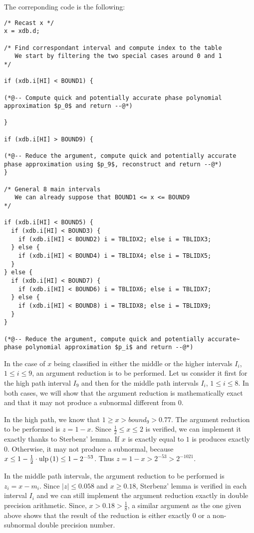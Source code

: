 The correponding code is the following:
\begin{lstlisting}[caption={Interval discrimination},firstnumber=1]
/* Recast x */
x = xdb.d;

/* Find correspondant interval and compute index to the table
   We start by filtering the two special cases around 0 and 1
*/

if (xdb.i[HI] < BOUND1) {

(*@-- Compute quick and potentially accurate phase polynomial approximation $p_0$ and return --@*)

}

if (xdb.i[HI] > BOUND9) {

(*@-- Reduce the argument, compute quick and potentially accurate
phase approximation using $p_9$, reconstruct and return --@*)
}

/* General 8 main intervals 
   We can already suppose that BOUND1 <= x <= BOUND9
*/

if (xdb.i[HI] < BOUND5) {
  if (xdb.i[HI] < BOUND3) {
    if (xdb.i[HI] < BOUND2) i = TBLIDX2; else i = TBLIDX3;
  } else {
    if (xdb.i[HI] < BOUND4) i = TBLIDX4; else i = TBLIDX5;
  }
} else {
  if (xdb.i[HI] < BOUND7) {
    if (xdb.i[HI] < BOUND6) i = TBLIDX6; else i = TBLIDX7;
  } else {
    if (xdb.i[HI] < BOUND8) i = TBLIDX8; else i = TBLIDX9;
  }
}

(*@-- Reduce the argument, compute quick and potentially accurate~
phase polynomial approximation $p_i$ and return --@*)
\end{lstlisting}

In the case of $x$ being classified in either the middle or the higher
intervals $I_i$, $1 \leq i \leq 9$, an argument reduction is to be
performed. Let us consider it first for the high path interval $I_9$
and then for the middle path intervals $I_i$, $1 \leq i \leq 8$. In
both cases, we will show that the argument reduction is mathematically
exact and that it may not produce a subnormal different from $0$.

In the high path, we know that $1 \geq x > bound_9 > 0.77$. The
argument reduction to be performed is $z = 1 - x$. Since $\frac{1}{2}
\leq x \leq 2$ is verified, we can implement it exactly thanks to
Sterbenz' lemma. If $x$ is exactly equal to $1$ is produces exactly
$0$. Otherwise, it may not produce a subnormal, because $x \leq 1 -
\frac{1}{2} \cdot \mathrm{ulp}\left( 1 \right) \leq 1 - 2^{-53}$. Thus $z = 1
- x > 2^{-53} > 2^{-1021}$.

In the middle path intervals, the argument reduction to be performed
is $z_i = x - m_i$. Since $\left \vert z \right \vert \leq 0.058$ and
$x \geq 0.18$, Sterbenz' lemma is verified in each interval $I_i$ and
we can still implement the argument reduction exactly in double
precision arithmetic. Since, $x > 0.18 > \frac{1}{8}$, a similar
argument as the one given above shows that the result of the reduction
is either exactly $0$ or a non-subnormal double precision number.

